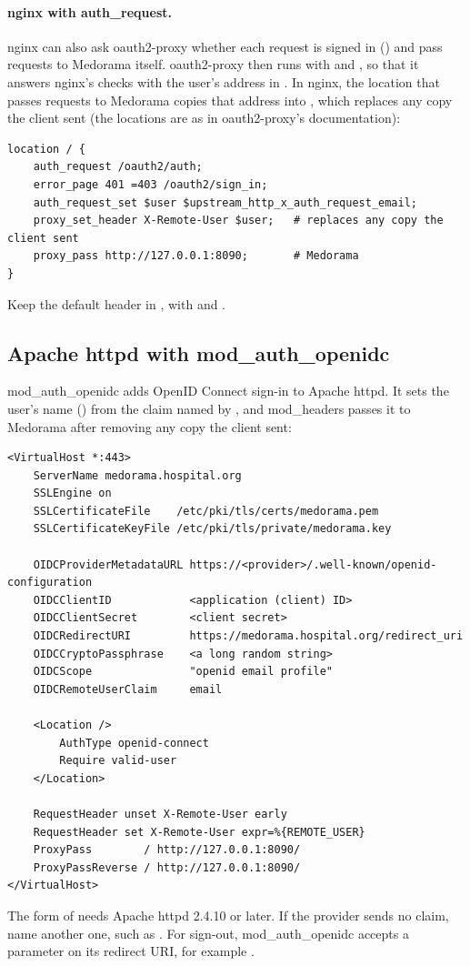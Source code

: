 \paragraph{nginx with auth\_request.} nginx can also ask oauth2-proxy whether each request is
signed in () and pass requests to Medorama itself. oauth2-proxy then runs with
 and , so that it answers
nginx's checks with the user's address in . In nginx, the location
that passes requests to Medorama copies that address into , which replaces
any copy the client sent (the  locations are as in oauth2-proxy's documentation):
\begin{lstlisting}[style=text]
location / {
    auth_request /oauth2/auth;
    error_page 401 =403 /oauth2/sign_in;
    auth_request_set $user $upstream_http_x_auth_request_email;
    proxy_set_header X-Remote-User $user;   # replaces any copy the client sent
    proxy_pass http://127.0.0.1:8090;       # Medorama
}
\end{lstlisting}
Keep the default header in , with 
and .

\subsection{Apache httpd with mod\_auth\_openidc}
\label{sec:sign-in-openidc}

mod\_auth\_openidc adds OpenID Connect sign-in to Apache httpd. It sets the user's name
() from the claim named by , and mod\_headers passes
it to Medorama after removing any copy the client sent:
\begin{lstlisting}[style=text]
<VirtualHost *:443>
    ServerName medorama.hospital.org
    SSLEngine on
    SSLCertificateFile    /etc/pki/tls/certs/medorama.pem
    SSLCertificateKeyFile /etc/pki/tls/private/medorama.key

    OIDCProviderMetadataURL https://<provider>/.well-known/openid-configuration
    OIDCClientID            <application (client) ID>
    OIDCClientSecret        <client secret>
    OIDCRedirectURI         https://medorama.hospital.org/redirect_uri
    OIDCCryptoPassphrase    <a long random string>
    OIDCScope               "openid email profile"
    OIDCRemoteUserClaim     email

    <Location />
        AuthType openid-connect
        Require valid-user
    </Location>

    RequestHeader unset X-Remote-User early
    RequestHeader set X-Remote-User expr=%{REMOTE_USER}
    ProxyPass        / http://127.0.0.1:8090/
    ProxyPassReverse / http://127.0.0.1:8090/
</VirtualHost>
\end{lstlisting}
The  form of  needs Apache httpd 2.4.10 or later. If the
provider sends no  claim, name another one, such as . For
sign-out, mod\_auth\_openidc accepts a  parameter on its redirect URI, for example
.


